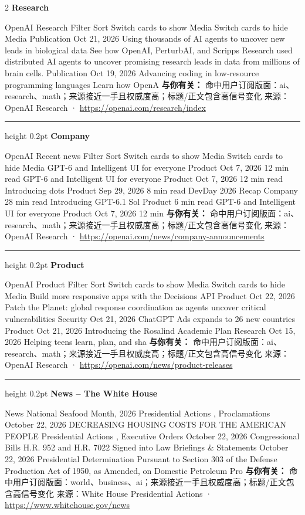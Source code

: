\documentclass[10.5pt]{ctexart}
\begin{document}
\begin{multicols}{2}
{\large\bfseries Research}\par
OpenAI Research Filter Sort Switch cards to show Media Switch cards to hide Media Publication Oct 21, 2026 Using thousands of AI agents to uncover new leads in biological data See how OpenAI, PerturbAI, and Scripps Research used distributed AI agents to uncover promising research leads in data from millions of brain cells. Publication Oct 19, 2026 Advancing coding in low‑resource programming languages Learn how OpenA
\textbf{与你有关：} 命中用户订阅版面：ai、research、math；来源接近一手且权威度高；标题/正文包含高信号变化
{\footnotesize\color{ormuted} 来源：OpenAI Research · \url{https://openai.com/research/index}}
\vspace{2mm}
\hrule height 0.2pt
\vspace{2mm}
{\large\bfseries Company}\par
OpenAI Recent news Filter Sort Switch cards to show Media Switch cards to hide Media GPT-6 and Intelligent UI for everyone Product Oct 7, 2026 12 min read GPT-6 and Intelligent UI for everyone Product Oct 7, 2026 12 min read Introducing dots Product Sep 29, 2026 8 min read DevDay 2026 Recap Company 28 min read Introducing GPT-6.1 Sol Product 6 min read GPT-6 and Intelligent UI for everyone Product Oct 7, 2026 12 min 
\textbf{与你有关：} 命中用户订阅版面：ai、research、math；来源接近一手且权威度高；标题/正文包含高信号变化
{\footnotesize\color{ormuted} 来源：OpenAI Research · \url{https://openai.com/news/company-announcements}}
\vspace{2mm}
\hrule height 0.2pt
\vspace{2mm}
{\large\bfseries Product}\par
OpenAI Product Filter Sort Switch cards to show Media Switch cards to hide Media Build more responsive apps with the Decisions API Product Oct 22, 2026 Patch the Planet: global response coordination as agents uncover critical vulnerabilities Security Oct 21, 2026 ChatGPT Ads expands to 26 new countries Product Oct 21, 2026 Introducing the Rosalind Academic Plan Research Oct 15, 2026 Helping teens learn, plan, and sha
\textbf{与你有关：} 命中用户订阅版面：ai、research、math；来源接近一手且权威度高；标题/正文包含高信号变化
{\footnotesize\color{ormuted} 来源：OpenAI Research · \url{https://openai.com/news/product-releases}}
\vspace{2mm}
\hrule height 0.2pt
\vspace{2mm}
{\large\bfseries News – The White House}\par
News National Seafood Month, 2026 Presidential Actions , Proclamations October 22, 2026 DECREASING HOUSING COSTS FOR THE AMERICAN PEOPLE Presidential Actions , Executive Orders October 22, 2026 Congressional Bills H.R. 952 and H.R. 7022 Signed into Law Briefings \& Statements October 22, 2026 Presidential Determination Pursuant to Section 303 of the Defense Production Act of 1950, as Amended, on Domestic Petroleum Pro
\textbf{与你有关：} 命中用户订阅版面：world、business、ai；来源接近一手且权威度高；标题/正文包含高信号变化
{\footnotesize\color{ormuted} 来源：White House Presidential Actions · \url{https://www.whitehouse.gov/news}}
\end{multicols}
\end{document}
